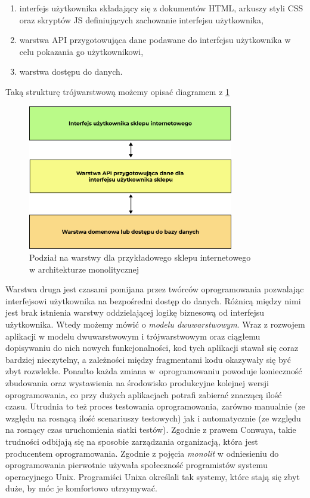\documentclass{SGGW-thesis}
\begin{document}
  \begin{enumerate}
    \item interfejs użytkownika składający się z dokumentów HTML, arkuszy styli CSS oraz skryptów JS definiujących zachowanie interfejsu użytkownika,
    \item warstwa API przygotowująca dane podawane do interfejsu użytkownika w celu pokazania go użytkownikowi,
    \item warstwa dostępu do danych.
  \end{enumerate}
  
  Taką strukturę trójwarstwową możemy opisać diagramem z \cref{fig:monolith_diagram}

  \begin{figure}[h]
    \centering
    \captionsetup{justification=centering}
    \includegraphics[width=0.8\textwidth]{monolith_diagram.png}
    \caption{Podział na warstwy dla przykładowego sklepu internetowego \\ w architekturze monolitycznej}
    \label{fig:monolith_diagram}
  \end{figure}

  Warstwa druga jest czasami pomijana przez twórców oprogramowania pozwalając interfejsowi użytkownika na bezpośredni dostęp do danych. Różnicą między nimi jest brak istnienia warstwy oddzielającej logikę biznesową od interfejsu użytkownika. Wtedy możemy mówić o \textit{modelu dwuwarstwowym}.
  Wraz z rozwojem aplikacji w modelu dwuwarstwowym i trójwarstwowym oraz ciągłemu dopisywaniu do nich nowych funkcjonalności, kod tych aplikacji stawał się coraz bardziej nieczytelny, a zależności między fragmentami kodu okazywały się być zbyt rozwlekłe. 
  Ponadto każda zmiana w~oprogramowaniu powoduje konieczność zbudowania oraz wystawienia na środowisko produkcyjne kolejnej wersji oprogramowania, co przy dużych aplikacjach potrafi zabierać znaczącą ilość czasu. Utrudnia to też proces testowania oprogramowania, zarówno manualnie (ze względu na rosnącą ilość scenariuszy testowych) jak i automatycznie (ze względu na rosnący czas uruchomienia siatki testów).
  Zgodnie z prawem Conwaya, takie trudności odbijają się na sposobie zarządzania organizacją, która jest producentem oprogramowania.
  Zgodnie z \cite{fowler} pojęcia \textit{monolit} w odniesieniu do oprogramowania pierwotnie używała społeczność programistów systemu operacyjnego Unix. Programiści Unixa określali tak systemy, które stają się zbyt duże, by móc je komfortowo utrzymywać. 
\end{document}
